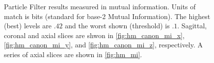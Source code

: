 \begin{figure}[H]
\caption{Particle Filter results measured in mutual information. 
         Units of match is bits (standard for base-2 Mutual Information). The highest (best) levels are 
         $.42$ and the worst shown (threshold) is $.1$.
        Sagittal, coronal and axial slices are shwon in \autoref{fig:hm_canon_mi_x},
        \autoref{fig:hm_canon_mi_y}, and \autoref{fig:hm_canon_mi_z}, respectively. 
        A series of axial slices are shown in \autoref{fig:hm_mi}.  }
\label{fig:hm_canon_pfilter_mi}
\end{figure}

